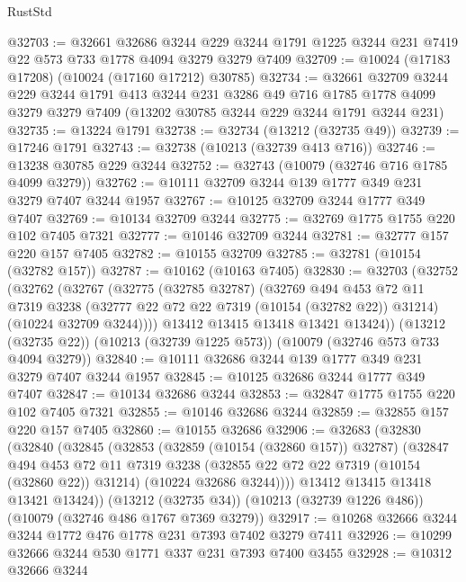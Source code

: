 \begin{lexlean}{RustStd}
\begin{coremodule}
{\begin{coremodule}
{{{{{{{{{{{{{{{{{{{{{{{{{{@32703 := @32661
    @32686
    @3244
    @229
    @3244
    @1791
    @1225
    @3244
    @231
    @7419
    @22
    @573
    @733
    @1778
    @4094
    @3279
    @3279
    @7409
@32709 := @10024 (@17183 @17208) (@10024 (@17160 @17212) @30785)
@32734 := @32661
    @32709
    @3244
    @229
    @3244
    @1791
    @413
    @3244
    @231
    @3286
    @49
    @716
    @1785
    @1778
    @4099
    @3279
    @3279
    @7409
    (@13202 @30785 @3244 @229 @3244 @1791 @3244 @231)
@32735 := @13224 @1791
@32738 := @32734 (@13212 (@32735 @49))
@32739 := @17246 @1791
@32743 := @32738 (@10213 (@32739 @413 @716))
@32746 := @13238 @30785 @229 @3244
@32752 := @32743 (@10079 (@32746 @716 @1785 @4099 @3279))
@32762 := @10111 @32709 @3244 @139 @1777 @349 @231 @3279 @7407 @3244 @1957
@32767 := @10125 @32709 @3244 @1777 @349 @7407
@32769 := @10134 @32709 @3244
@32775 := @32769 @1775 @1755 @220 @102 @7405 @7321
@32777 := @10146 @32709 @3244
@32781 := @32777 @157 @220 @157 @7405
@32782 := @10155 @32709
@32785 := @32781 (@10154 (@32782 @157))
@32787 := @10162 (@10163 @7405)
@32830 := @32703
    (@32752
      (@32762
        (@32767
          (@32775
            (@32785 @32787)
            (@32769
              @494
              @453
              @72
              @11
              @7319
              @3238
              (@32777 @22 @72 @22 @7319 (@10154 (@32782 @22)) @31214)
              (@10224 @32709 @3244))))
        @13412
        @13415
        @13418
        @13421
        @13424))
    (@13212 (@32735 @22))
    (@10213 (@32739 @1225 @573))
    (@10079 (@32746 @573 @733 @4094 @3279))
@32840 := @10111 @32686 @3244 @139 @1777 @349 @231 @3279 @7407 @3244 @1957
@32845 := @10125 @32686 @3244 @1777 @349 @7407
@32847 := @10134 @32686 @3244
@32853 := @32847 @1775 @1755 @220 @102 @7405 @7321
@32855 := @10146 @32686 @3244
@32859 := @32855 @157 @220 @157 @7405
@32860 := @10155 @32686
@32906 := @32683
    (@32830
      (@32840
        (@32845
          (@32853
            (@32859 (@10154 (@32860 @157)) @32787)
            (@32847
              @494
              @453
              @72
              @11
              @7319
              @3238
              (@32855 @22 @72 @22 @7319 (@10154 (@32860 @22)) @31214)
              (@10224 @32686 @3244))))
        @13412
        @13415
        @13418
        @13421
        @13424))
    (@13212 (@32735 @34))
    (@10213 (@32739 @1226 @486))
    (@10079 (@32746 @486 @1767 @7369 @3279))
@32917 := @10268 @32666 @3244 @3244 @1772 @476 @1778 @231 @7393 @7402 @3279 @7411
@32926 := @10299 @32666 @3244 @530 @1771 @337 @231 @7393 @7400 @3455
@32928 := @10312 @32666 @3244
}}}}}}}}}}}}}}}}}}}}}}}}}}
\end{coremodule}}
\end{coremodule}
\end{lexlean}
